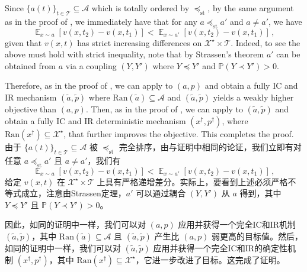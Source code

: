 \documentclass[12pt,letterpaper]{article}
\newenvironment{original}{\color{black}\noindent}{}
\newenvironment{translation}{\color{blue}\noindent}{}
\theoremstyle{plain}
\theoremstyle{definition}
\theoremstyle{remark}
\DeclareMathOperator{\E}{\mathds{E}}
\renewcommand{\P}{\mathds{P}}
\renewcommand{\1}{\mathds{1}}
\theoremstyle{definition}
\begin{document}
\begin{original}
Since $\{a(t)\}_{t \in \mathcal{T}} \subseteq \mathcal{A}$ which is totally ordered by $\preceq_{\text{st}}$, by the same argument as in the proof of , we immediately have that for any $a \preceq_{\text{st}} a'$ and $a \neq a'$, we have
\[ \E_{x \sim a}[v(x, t_2) - v(x, t_1)] < \E_{x \sim a'}[v(x, t_2) - v(x, t_1)]\,,\]
given that $v(x, t)$ has strict increasing differences on $\mathcal{X}^\star \times \mathcal{T}$. Indeed, to see the above must hold with strict inequality, note that by Strassen's theorem $a'$ can be obtained from $a$ via a coupling $(Y, Y')$ where $Y \preceq Y'$ and $\P(Y \prec Y') > 0$.

Therefore, as in the proof of , we can apply  to $(a, p)$ and obtain a fully IC and IR mechanism $(\tilde{a}, \tilde{p})$ where $\text{Ran}(\tilde{a}) \subseteq \mathcal{A}$ and $(\tilde{a}, \tilde{p})$ yields a weakly higher objective than $(a, p)$. Then, as in the proof of , we can apply  to $(\tilde{a}, \tilde{p})$ and obtain a fully IC and IR deterministic mechanism $(x^\dagger, p^\dagger)$, where $\text{Ran}(x^\dagger) \subseteq \mathcal{X}^\star$, that further improves the objective. This completes the proof.
\end{original}
\begin{translation}
由于 $\{a(t)\}_{t \in \mathcal{T}} \subseteq \mathcal{A}$ 被 $\preceq_{\text{st}}$ 完全排序，由与证明中相同的论证，我们立即有对任意 $a \preceq_{\text{st}} a'$ 且 $a \neq a'$，我们有
\[ \E_{x \sim a}[v(x, t_2) - v(x, t_1)] < \E_{x \sim a'}[v(x, t_2) - v(x, t_1)]\,,\]
给定 $v(x, t)$ 在 $\mathcal{X}^\star \times \mathcal{T}$ 上具有严格递增差分。实际上，要看到上述必须严格不等式成立，注意由Strassen定理，$a'$ 可以通过耦合 $(Y, Y')$ 从 $a$ 得到，其中 $Y \preceq Y'$ 且 $\P(Y \prec Y') > 0$。

因此，如同的证明中一样，我们可以对 $(a, p)$ 应用并获得一个完全IC和IR机制 $(\tilde{a}, \tilde{p})$，其中 $\text{Ran}(\tilde{a}) \subseteq \mathcal{A}$ 且 $(\tilde{a}, \tilde{p})$ 产生比 $(a, p)$ 弱更高的目标值。然后，如同的证明中一样，我们可以对 $(\tilde{a}, \tilde{p})$ 应用并获得一个完全IC和IR的确定性机制 $(x^\dagger, p^\dagger)$，其中 $\text{Ran}(x^\dagger) \subseteq \mathcal{X}^\star$，它进一步改进了目标。这完成了证明。
\end{translation}
\end{document}
